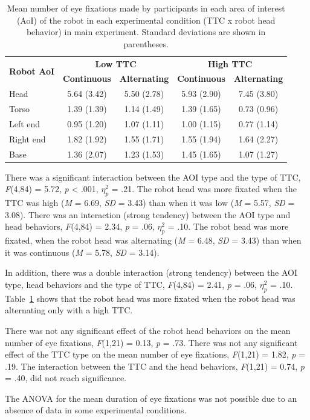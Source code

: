 \documentclass[a4paper,11pt,twoside]{StyleThese}
\begin{document}
\begin{itemize}
\begin{table}[!htbp]
	\centering
    \begin{tabular}{lcccc}
    \hline
    \multirow{2}{*}{\textbf{Robot AoI}} & \multicolumn{2}{c}{\textbf{Low TTC}} & \multicolumn{2}{c}{\textbf{High TTC}} \\
    \cline{2-5} 
               & \textbf{Continuous}  & \textbf{Alternating}  & \textbf{Continuous}  & \textbf{Alternating}   \\
    \hline
    Head       & 5.64 (3.42)  & 5.50 (2.78)  & 5.93 (2.90)  & 7.45 (3.80)   \\
    Torso      & 1.39 (1.39)  & 1.14 (1.49)  & 1.39 (1.65)  & 0.73 (0.96)   \\
    Left end   & 0.95 (1.20)  & 1.07 (1.11)  & 1.00 (1.15)  & 0.77 (1.14)   \\
    Right end  & 1.82 (1.92)  & 1.55 (1.71)  & 1.55 (1.94)  & 1.64 (2.27)   \\
    Base       & 1.36 (2.07)  & 1.23 (1.53)  & 1.45 (1.65)  & 1.07 (1.27)   \\
    \hline
\end{tabular}
   \caption{\label{table:eye_fixation_ttc_head} Mean number of eye fixations made by participants in each area of interest (AoI) of the robot in each experimental condition (TTC x robot head behavior) in main experiment. Standard deviations are shown in parentheses.}
\end{table}

There was a significant interaction between the AOI type and the type of TTC, \textit{F}(4,84) = 5.72, \textit{p} < .001, $\eta_{p}^{2}$ = .21. The robot head was more fixated when the TTC was high (\textit{M} = 6.69, \textit{SD} = 3.43) than when it was low (\textit{M} = 5.57, \textit{SD} = 3.08). There was an interaction (strong tendency) between the AOI type and head behaviors, \textit{F}(4,84) = 2.34, \textit{p} = .06, $\eta_{p}^{2}$ = .10. The robot head was more fixated, when the robot head was alternating  (\textit{M} = 6.48, \textit{SD} = 3.43) than when it was continuous (\textit{M} = 5.78, \textit{SD} = 3.14).

In addition, there was a double interaction (strong tendency) between the AOI type, head behaviors and the type of TTC, \textit{F}(4,84) = 2.41, \textit{p} = .06, $\eta_{p}^{2}$ = .10. Table~\ref{table:eye_fixation_ttc_head} shows that the robot head was more fixated when the robot head was alternating only with a high TTC.

There was not any significant effect of the robot head behaviors on the mean number of eye fixations, \textit{F}(1,21) = 0.13, \textit{p} = .73. There was not any significant effect of the TTC type on the mean number of eye fixations, \textit{F}(1,21) = 1.82, \textit{p} = .19. The interaction between the TTC and the head behaviors, \textit{F}(1,21) = 0.74, \textit{p} = .40, did not reach significance.

The ANOVA for the mean duration of eye fixations was not possible due to an absence of data in some experimental conditions.
\end{itemize}
\end{document}
